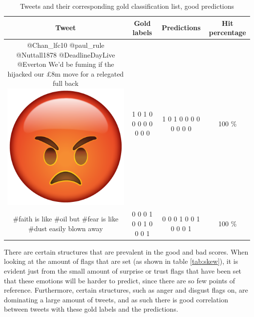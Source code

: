 \begin{table}[h]
\begin{tabular}{c|c|c|c|}
Tweet & Gold labels & Predictions & Hit percentage \\ \hline
\parbox[t]{6cm}{@Chan\_lfc10 @paul\_rule @Nuttall1878 @DeadlineDayLive @Everton We'd be fuming if the hijacked our £8m move for a relegated full back \includegraphics[scale=0.015]{pictures/very_angry_emoji.png}} & 1 0 1 0 0 0 0 0 0 0 0 & 1 0 1 0 0 0 0 0 0 0 0 & 100 \% \\ \hline
\parbox[t]{6cm}{\#faith is like \#oil but \#fear is like \#dust easily blown away} & 0 0 0 1 0 0 1 0 0 0 1 & 0 0 0 1 0 0 1 0 0 0 1 & 100 \% 
\end{tabular}
\caption{Tweets and their corresponding gold classification list, good predictions}
\label{tab:classerrorlow}
\end{table}
There are certain structures that are prevalent in the good and bad scores. When looking at the amount of flags that are set (as shown in table \ref{tab:skew}), it is evident just from the small amount of surprise or trust flags that have been set that these emotions will be harder to predict, since there are so few points of reference. Furthermore, certain structures, such as anger and disgust flags on, are dominating a large amount of tweets, and as such there is good correlation between tweets with these gold labels and the predictions.


